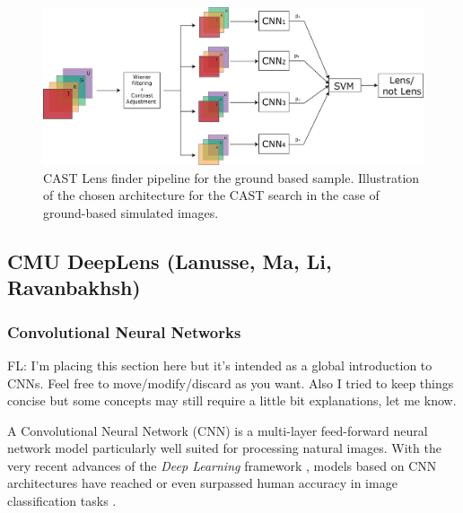 \documentclass[useAMS,usenatbib]{mnras}
\newcommand{\fl}[1]{{\color{magenta}FL: #1}}
\begin{document}

\begin{figure}
 \includegraphics[width=\columnwidth]{figures/SLchallengeCAST.png}
 \caption{CAST Lens finder pipeline for the ground based sample. Illustration of the chosen architecture for the CAST search in the case of ground-based simulated images.}
 \label{colorCASTCNN}
\end{figure}

\subsection{CMU DeepLens (Lanusse, Ma, Li, Ravanbakhsh)}

\subsubsection{Convolutional Neural Networks}
\fl{I'm placing this section here but it's intended as a global introduction to CNNs. Feel free to move/modify/discard as you want. Also I tried to keep things concise but some concepts may still require a little bit explanations, let me know.}

A Convolutional Neural Network (CNN) \citep{Lecun1998} is a multi-layer feed-forward neural network model particularly well suited for processing natural images. With the very recent advances of the \textit{Deep Learning} framework \citep{Lecun2015}, models based on CNN architectures have reached or even surpassed human accuracy in image classification tasks \citep{He2015a}.
\end{document}
